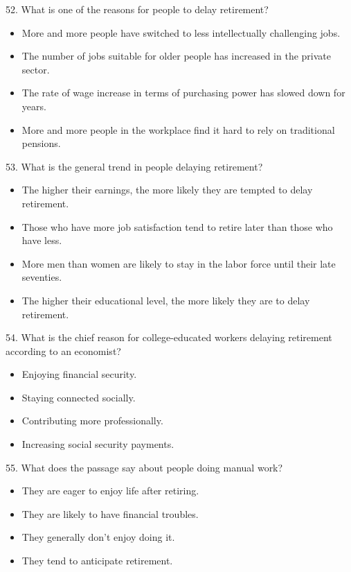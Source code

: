 \documentclass[UTF8,11pt]{ctexart}
\begin{document}
52. What is one of the reasons for people to delay retirement?


\begin{itemize}[leftmargin=2em,itemsep=.2em,topsep=.4em]\item[A.] More and more people have switched to less intellectually challenging jobs.
\item[B.] The number of jobs suitable for older people has increased in the private sector.
\item[C.] The rate of wage increase in terms of purchasing power has slowed down for years.
\item[D.] More and more people in the workplace find it hard to rely on traditional pensions.
\end{itemize}

53. What is the general trend in people delaying retirement?


\begin{itemize}[leftmargin=2em,itemsep=.2em,topsep=.4em]\item[A.] The higher their earnings, the more likely they are tempted to delay retirement.
\item[B.] Those who have more job satisfaction tend to retire later than those who have less.
\item[C.] More men than women are likely to stay in the labor force until their late seventies.
\item[D.] The higher their educational level, the more likely they are to delay retirement.
\end{itemize}

54. What is the chief reason for college-educated workers delaying retirement according to an economist?


\begin{itemize}[leftmargin=2em,itemsep=.2em,topsep=.4em]\item[A.] Enjoying financial security.
\item[B.] Staying connected socially.
\item[C.] Contributing more professionally.
\item[D.] Increasing social security payments.
\end{itemize}

55. What does the passage say about people doing manual work?


\begin{itemize}[leftmargin=2em,itemsep=.2em,topsep=.4em]\item[A.] They are eager to enjoy life after retiring.
\item[B.] They are likely to have financial troubles.
\item[C.] They generally don’t enjoy doing it.
\item[D.] They tend to anticipate retirement.
\end{itemize}
\end{document}
